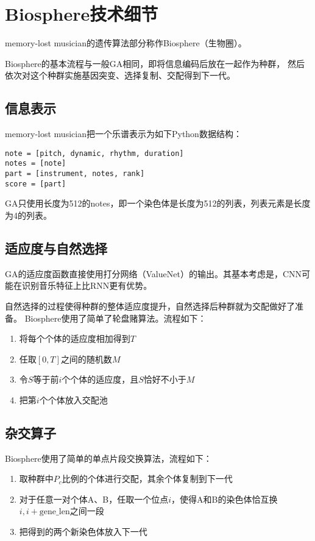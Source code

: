 \documentclass{ctexart}
\begin{document}
\fi

\section{Biosphere技术细节}
memory-lost musician的遗传算法部分称作Biosphere（生物圈）。

Biosphere的基本流程与一般GA相同，即将信息编码后放在一起作为种群，
然后依次对这个种群实施基因突变、选择复制、交配得到下一代。

\subsection{信息表示}
memory-lost musician把一个乐谱表示为如下Python数据结构：
\begin{lstlisting}
note = [pitch, dynamic, rhythm, duration]
notes = [note]
part = [instrument, notes, rank]
score = [part]
\end{lstlisting}
GA只使用长度为512的notes，即一个染色体是长度为512的列表，列表元素是长度为4的列表。

\subsection{适应度与自然选择}
GA的适应度函数直接使用打分网络（ValueNet）的输出。其基本考虑是，CNN可能在识别音乐特征上比RNN更有优势。

自然选择的过程使得种群的整体适应度提升，自然选择后种群就为交配做好了准备。
Biosphere使用了简单了轮盘赌算法。流程如下：
\begin{enumerate}[nosep]
  \item 将每个个体的适应度相加得到$T$
  \item 任取$[0,T]$之间的随机数$M$
  \item 令$S$等于前$i$个个体的适应度，且$S$恰好不小于$M$
  \item 把第$i$个个体放入交配池
\end{enumerate}

\subsection{杂交算子}
Biosphere使用了简单的单点片段交换算法，流程如下：
\begin{enumerate}[nosep]
  \item 取种群中$P_c$比例的个体进行交配，其余个体复制到下一代
  \item 对于任意一对个体A、B，任取一个位点$i$，使得A和B的染色体恰互换$i,i+\mathrm{gene\_len}$之间一段
  \item 把得到的两个新染色体放入下一代
\end{enumerate}
\end{document}
